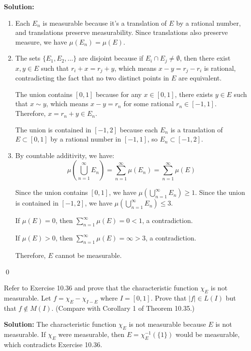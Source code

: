 \noindent\textbf{Solution:}
\begin{enumerate}[label=(\alph*)]
    \item Each $E_n$ is measurable because it's a translation of $E$ by a rational number, and translations preserve measurability. Since translations also preserve measure, we have $\mu(E_n) = \mu(E)$.
    
    \item The sets $\{E_1, E_2, \ldots \}$ are disjoint because if $E_i \cap E_j \neq \emptyset$, then there exist $x, y \in E$ such that $r_i + x = r_j + y$, which means $x - y = r_j - r_i$ is rational, contradicting the fact that no two distinct points in $E$ are equivalent.
    
    The union contains $[0, 1]$ because for any $x \in [0, 1]$, there exists $y \in E$ such that $x \sim y$, which means $x - y = r_n$ for some rational $r_n \in [-1, 1]$. Therefore, $x = r_n + y \in E_n$.
    
    The union is contained in $[-1, 2]$ because each $E_n$ is a translation of $E \subset [0, 1]$ by a rational number in $[-1, 1]$, so $E_n \subset [-1, 2]$.
    
    \item By countable additivity, we have:
    \[\mu\left(\bigcup_{n=1}^{\infty} E_n\right) = \sum_{n=1}^{\infty} \mu(E_n) = \sum_{n=1}^{\infty} \mu(E)\]
    
    Since the union contains $[0, 1]$, we have $\mu(\bigcup_{n=1}^{\infty} E_n) \geq 1$. Since the union is contained in $[-1, 2]$, we have $\mu(\bigcup_{n=1}^{\infty} E_n) \leq 3$.
    
    If $\mu(E) = 0$, then $\sum_{n=1}^{\infty} \mu(E) = 0 < 1$, a contradiction.
    
    If $\mu(E) > 0$, then $\sum_{n=1}^{\infty} \mu(E) = \infty > 3$, a contradiction.
    
    Therefore, $E$ cannot be measurable.
\end{enumerate}\qed


\begin{problembox}
Refer to Exercise 10.36 and prove that the characteristic function $\chi_E$ is not measurable. Let $f = \chi_E - \chi_{I-E}$ where $I = [0, 1]$. Prove that $|f| \in L(I)$ but that $f \notin M(I)$. (Compare with Corollary 1 of Theorem 10.35.)
\end{problembox}

\noindent\textbf{Solution:}
The characteristic function $\chi_E$ is not measurable because $E$ is not measurable. If $\chi_E$ were measurable, then $E = \chi_E^{-1}(\{1\})$ would be measurable, which contradicts Exercise 10.36.

